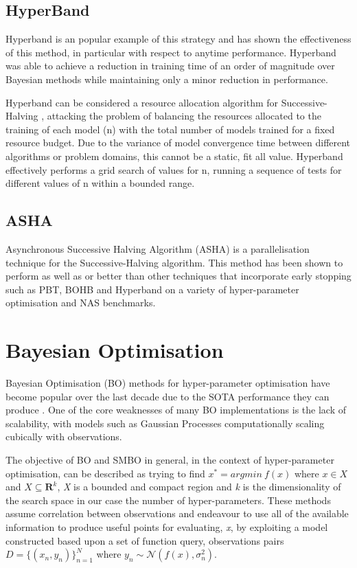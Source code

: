 \documentclass{article}
\begin{document}
	\subsection{HyperBand}

		Hyperband \cite{48} is an popular example of this strategy and has shown the effectiveness of this method, in particular with respect to anytime performance. Hyperband was able to achieve a reduction in training time of an order of magnitude over Bayesian methods while maintaining only a minor reduction in performance.

		Hyperband can be considered a resource allocation algorithm for Successive-Halving \cite{45}, attacking the problem of balancing the resources allocated to the training of each model (n) with the total number of models trained for a fixed resource budget. Due to the variance of model convergence time between different algorithms or problem domains, this cannot be a static, fit all value. Hyperband effectively performs a grid search of values for n, running a sequence of tests for different values of n within a bounded range.


	\subsection{ASHA}

		Asynchronous Successive Halving Algorithm (ASHA) \cite{34} is a parallelisation technique for the Successive-Halving algorithm. This method has been shown to perform as well as or better than other techniques that incorporate early stopping such as PBT, BOHB and Hyperband on a variety of hyper-parameter optimisation and NAS benchmarks.




\section {Bayesian Optimisation}

	Bayesian Optimisation (BO) methods for hyper-parameter optimisation have become popular over the last decade due to the SOTA performance they can produce \cite{32} \cite{20}. One of the core weaknesses of many BO implementations is the lack of scalability, with models such as Gaussian Processes computationally scaling cubically with observations.
	\par

	The objective of BO and SMBO in general, in the context of hyper-parameter optimisation, can be described as trying to find \(x^* = argmin~ f(x)\) where \(x \in X\) and \(X \subseteq \mathbf{R} ^k\), \textit{X} is a bounded and compact region and \textit{k} is the dimensionality of the search space in our case the number of hyper-parameters. These methods assume correlation between observations and endeavour to use all of the available information to produce useful points for evaluating, \textit{x}, by exploiting a model constructed based upon a set of function query, observations pairs \( D = \{(x_n,y_n)\}_{n=1}^N\) where \(y_n \sim \mathcal{N}(f(x), \sigma_n^2) \).
\end{document}

